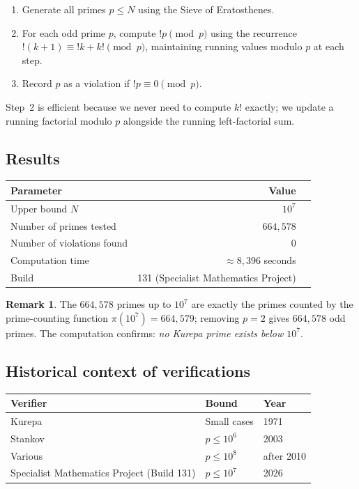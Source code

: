 \documentclass[12pt,a4paper]{amsart}
\theoremstyle{definition}
\newtheorem{remark}[theorem]{Remark}
\begin{document}
\begin{enumerate}
\item Generate all primes $p \leq N$ using the Sieve of Eratosthenes.
\item For each odd prime $p$, compute $!p \pmod p$ using the recurrence
      $!(k+1) \equiv !k + k! \pmod p$, maintaining running values
      modulo $p$ at each step.
\item Record $p$ as a violation if $!p \equiv 0 \pmod p$.
\end{enumerate}

Step~2 is efficient because we never need to compute $k!$ exactly; we update
a running factorial modulo $p$ alongside the running left-factorial sum.

\subsection{Results}

\begin{center}
\begin{tabular}{@{}lrr@{}}
\toprule
Parameter & Value \\
\midrule
Upper bound $N$ & $10^7$ \\
Number of primes tested & $664{,}578$ \\
Number of violations found & $0$ \\
Computation time & $\approx 8{,}396$ seconds \\
Build & 131 (Specialist Mathematics Project) \\
\bottomrule
\end{tabular}
\end{center}

\begin{remark}
The $664{,}578$ primes up to $10^7$ are exactly the primes counted by the
prime-counting function $\pi(10^7) = 664{,}579$; removing $p=2$ gives
$664{,}578$ odd primes.
The computation confirms: \emph{no Kurepa prime exists below $10^7$}.
\end{remark}

\subsection{Historical context of verifications}

\begin{center}
\begin{tabular}{@{}lll@{}}
\toprule
Verifier & Bound & Year \\
\midrule
Kurepa & Small cases & 1971 \\
Stankov & $p \leq 10^6$ & 2003 \\
Various & $p \leq 10^8$ & after 2010 \\
Specialist Mathematics Project (Build 131) & $p \leq 10^7$ & 2026 \\
\bottomrule
\end{tabular}
\end{center}
\end{document}
